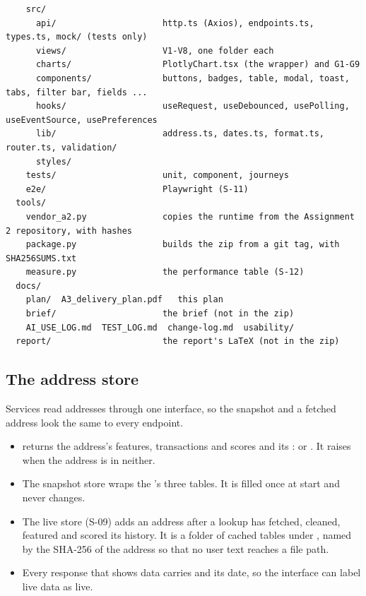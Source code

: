 \begin{lstlisting}
    src/
      api/                     http.ts (Axios), endpoints.ts, types.ts, mock/ (tests only)
      views/                   V1-V8, one folder each
      charts/                  PlotlyChart.tsx (the wrapper) and G1-G9
      components/              buttons, badges, table, modal, toast, tabs, filter bar, fields ...
      hooks/                   useRequest, useDebounced, usePolling, useEventSource, usePreferences
      lib/                     address.ts, dates.ts, format.ts, router.ts, validation/
      styles/
    tests/                     unit, component, journeys
    e2e/                       Playwright (S-11)
  tools/
    vendor_a2.py               copies the runtime from the Assignment 2 repository, with hashes
    package.py                 builds the zip from a git tag, with SHA256SUMS.txt
    measure.py                 the performance table (S-12)
  docs/
    plan/  A3_delivery_plan.pdf   this plan
    brief/                     the brief (not in the zip)
    AI_USE_LOG.md  TEST_LOG.md  change-log.md  usability/
  report/                      the report's LaTeX (not in the zip)
\end{lstlisting}

\subsection{The address store}
\label{sec:store}

Services read addresses through one interface, so the snapshot and a fetched address look the same
to every endpoint.

\begin{itemize}
  \item {} returns the address's features, transactions and scores
    and its :  or . It raises  when the
    address is in neither.
  \item The snapshot store wraps the 's three tables. It is filled once at start
    and never changes.
  \item The live store (S-09) adds an address after a lookup has fetched, cleaned, featured and
    scored its history. It is a folder of cached tables under , named by the SHA-256
    of the address so that no user text reaches a file path.
  \item Every response that shows data carries  and its date, so the interface can
    label live data as live.
\end{itemize}

